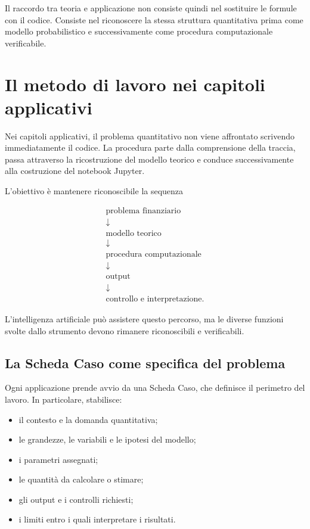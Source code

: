 Il raccordo tra teoria e applicazione non consiste quindi nel sostituire le
formule con il codice. Consiste nel riconoscere la stessa struttura
quantitativa prima come modello probabilistico e successivamente come procedura
computazionale verificabile.

\section{Il metodo di lavoro nei capitoli applicativi}

Nei capitoli applicativi, il problema quantitativo non viene affrontato
scrivendo immediatamente il codice. La procedura parte dalla comprensione della
traccia, passa attraverso la ricostruzione del modello teorico e conduce
successivamente alla costruzione del notebook Jupyter.

L'obiettivo \`{e} mantenere riconoscibile la sequenza

\[
\begin{array}{c}
\text{problema finanziario}
\\[4pt]
\downarrow
\\[4pt]
\text{modello teorico}
\\[4pt]
\downarrow
\\[4pt]
\text{procedura computazionale}
\\[4pt]
\downarrow
\\[4pt]
\text{output}
\\[4pt]
\downarrow
\\[4pt]
\text{controllo e interpretazione}.
\end{array}
\]

L'intelligenza artificiale pu\`{o} assistere questo percorso, ma le diverse
funzioni svolte dallo strumento devono rimanere riconoscibili e verificabili.

\subsection{La Scheda Caso come specifica del problema}

Ogni applicazione prende avvio da una Scheda Caso, che definisce il perimetro
del lavoro. In particolare, stabilisce:

\begin{itemize}
\item il contesto e la domanda quantitativa;

\item le grandezze, le variabili e le ipotesi del modello;

\item i parametri assegnati;

\item le quantit\`{a} da calcolare o stimare;

\item gli output e i controlli richiesti;

\item i limiti entro i quali interpretare i risultati.
\end{itemize}

